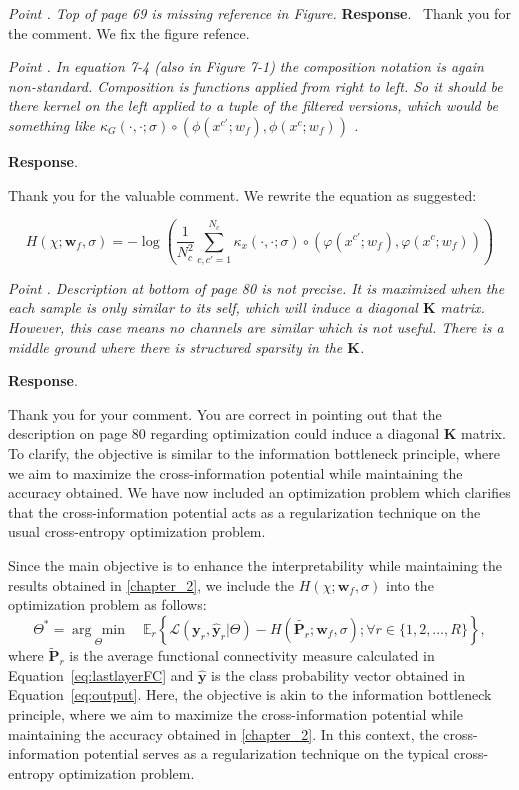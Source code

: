 \documentclass[runningheads]{llncs}
\providecommand{\promeddd}[2]{\mathbb{E}_{#1}\!\left\{#2\right\}}%
\newcommand{\ve}[1]{\bm {#1}}
\newcommand{\mat}[1]{\bm {#1}}
\newenvironment{reviewer}{\setcounter{pointcounter}{1}}{}
\newcommand{\changes}[1]{\textcolor[rgb]{1.00,0.00,0.00}{#1}}
\newcommand{\point}[1]{\medskip \noindent
 \textsl{{\fontseries{b}\selectfont Point \thepointcounter}.
 \stepcounter{pointcounter} #1}}
\newcommand{\reply}{\medskip \noindent \textbf{Response}.\ }
\begin{document}
\begin{reviewer}
{\point{Top of page 69 is missing reference in Figure.}
\reply{
    Thank you for the comment. We fix the figure refence.
}

\point{In equation 7-4 (also in Figure 7-1) the composition notation is again non-standard. Composition is functions applied from right to left. So it should be there kernel on the left applied to a tuple of the filtered versions, which would be something like $\kappa_G(\cdot,\cdot;\sigma) \circ\left (\phi(x^{c'};w_f), \phi(x^{c};w_f)\right )$ .}

\reply{
    Thank you for the valuable comment. We rewrite the equation as suggested:

    \changes{
        \begin{equation}
          H(\chi; \mathbf{w}_f, \sigma) = - \log \left( \frac{1}{N_c^2} \sum_{c,c'=1}^{N_c} \kappa_{x}(\cdot, \cdot;\sigma) \circ\left (\varphi(x^{c'};w_f), \varphi(x^{c};w_f)\right ) \right) 
        \end{equation}
        }
}

\point{Description at bottom of page 80 is not  precise. It is maximized when the each sample is only similar to its self, which will induce a diagonal $\mathbf{K}$ matrix.  However, this case means no channels are similar which is not useful. There is a middle ground where there is structured sparsity in the $\mathbf{K}$.}

\reply{
    Thank you for your comment. You are correct in pointing out that the description on page 80 regarding optimization could induce a diagonal $\mathbf{K}$ matrix. To clarify, the objective is similar to the information bottleneck principle, where we aim to maximize the cross-information potential while maintaining the accuracy obtained. We have now included an optimization problem which clarifies that the cross-information potential acts as a regularization technique on the usual cross-entropy optimization problem.

    \changes{Since the main objective is to enhance the interpretability while maintaining the results obtained in \cref{chapter_2}, we include the $H(\chi; \mathbf{w}_f, \sigma)$ into the optimization problem as follows: 
    \begin{equation}
      \Theta^{*} = \underset{\Theta}{\arg\,\min} \quad \promeddd{r}{\mathcal{L}(\ve{y}_r,\hat{\ve{y}}_r|\Theta) - H(\tilde{\mat{P}_r}; \mathbf{w}_f, \sigma); \forall r\in\{1,2,\dots,R\}},
    \end{equation}
    where $\tilde{\mat{P}}_r$ is the average functional connectivity measure calculated in Equation~\eqref{eq:lastlayerFC} and $\hat{\ve{y}}$ is the class probability vector obtained in Equation~\eqref{eq:output}. Here, the objective is akin to the information bottleneck principle, where we aim to maximize the cross-information potential while maintaining the accuracy obtained in \cref{chapter_2}. In this context, the cross-information potential serves as a regularization technique on the typical cross-entropy optimization problem.
    }
}

}
\end{reviewer}
\end{document}
